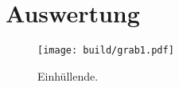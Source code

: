 
\section{Auswertung}
\label{sec:Auswertung}

\begin{figure}[H]
	\centering
	\caption{Einhüllende.}
	\texttt{[image: build/grab1.pdf]}
	\label{fig:graein}
\end{figure}


